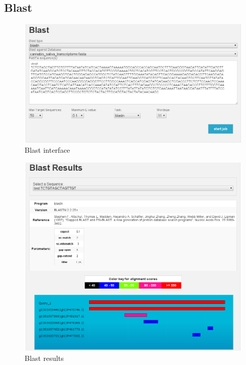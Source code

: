 \documentclass[english]{scrartcl}
\begin{document}
\subsection{Blast}
\begin{figure}
\begin{center}
  \includegraphics[width=\textwidth]{figures/blast.png}
  \caption{Blast interface}
  \label{fig:blast}
\end{center}
\end{figure}
\begin{figure}
\begin{center}
  \includegraphics[width=\textwidth]{figures/blast_results_1.png}
  \caption{Blast results}
  \label{fig:blast_results_1}
\end{center}
\end{figure}
\end{document}
